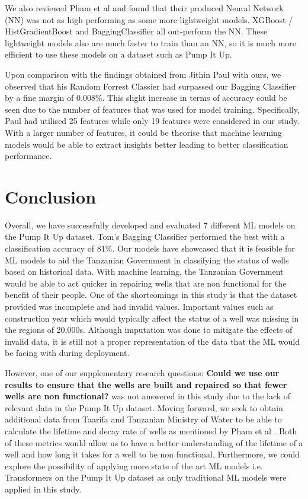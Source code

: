 \documentclass[conference]{IEEEtran}
\begin{document}
We also reviewed Pham et al \cite{Pham_2018} and found that their produced Neural Network (NN) was not as high performing as some more lightweight models. XGBoost / HistGradientBoost and BaggingClassifier all out-perform the NN. These lightweight models also are much faster to train than an NN, so it is much more efficient to use these models on a dataset such as Pump It Up.

Upon comparison with the findings obtained from Jithin Paul \cite{Paul_2023} with ours, we observed that his Random Forrest Classier had surpassed our Bagging Classifier by a fine margin of 0.008\%. This slight increase in terms of accuracy could be seen due to the number of features that was used for model training. Specifically, Paul had utilised 25 features while only 19 features were considered in our study. With a larger number of features, it could be theorise that machine learning models would be able to extract insights better leading to better classification performance.

\section{Conclusion}

Overall, we have successfully developed and evaluated 7 different ML models on the Pump It Up dataset. Tom's Bagging Classifier performed the best with a classification accuracy of 81\%. Our  models have showcased that it is feasible for ML models to aid the Tanzanian Government in classifying the status of wells based on historical data. With machine learning, the Tanzanian Government would be able to act quicker in repairing wells that are non functional for the benefit of their people. One of the shortcomings in this study is that the dataset provided was incomplete and had invalid values. Important values such as construction year which would typically affect the status of a well was missing in the regions of 20,000s. Although imputation was done to mitigate the effects of invalid data, it is still not a proper representation of the data that the ML would be facing with during deployment.

However, one of our supplementary research questions: \textbf{Could we use our results to ensure that the wells are built and repaired so that fewer wells are non functional?} was not answered in this study due to the lack of relevant data in the Pump It Up dataset. Moving forward, we seek to obtain additional data from Taarifa and Tanzanian Ministry of Water to be able to calculate the lifetime and decay rate of wells as mentioned by Pham et al \cite{Pham_2018}. Both of these metrics would allow us to have a better understanding of the lifetime of a well and how long it takes for a well to be non functional. Furthermore, we could explore the possibility of applying more state of the art ML models i.e. Transformers on the Pump It Up dataset as only traditional ML models were applied in this study. 



\end{document}
